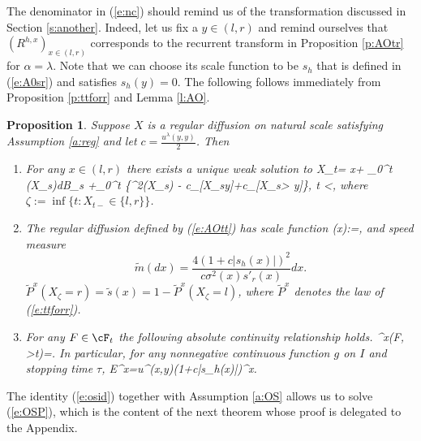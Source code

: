 \documentclass[11pt,reqno]{amsart}
\numberwithin{equation}{section}
\newtheorem{proposition}{Proposition}[section]
\begin{document}
The denominator in (\ref{e:nc}) should remind us of the transformation discussed in Section \ref{s:another}. Indeed, let us fix a $y \in (l,r)$ and remind ourselves that $(R^{h,x})_{x \in (l,r)}$ corresponds to the recurrent transform in Proposition \ref{p:AOtr} for $\alpha =\lambda$. Note that we can choose its scale function to be $s_h$ that is defined in (\ref{e:A0sr})  and satisfies $s_h(y)=0$.  The following follows immediately from Proposition \ref{p:ttforr} and Lemma \ref{l:AO}.
\begin{proposition} \label{p:AOtt} Suppose $X$ is a regular diffusion on natural scale satisfying Assumption \ref{a:reg} and let $c=\frac{u^{\lambda}(y,y)}{2}$. Then
	\begin{enumerate}
		\item For any $x \in (l,r)$ there exists a unique weak solution to 
		\be \label{e:AOtt}
		X_t= x+ \int_0^t \sigma(X_s)dB_s +\int_0^t \left\{\sigma^2(X_s) - c\chf_{[X_s\leq y]}+c\chf_{[X_s> y]}\right\}, \quad t <\zeta,
		\ee
		where $\zeta:=\inf\{t: X_{t-}\in \{l,r\}\}$.
		\item The regular diffusion defined by (\ref{e:AOtt}) has scale function
		\be \label{e:AOttscale}
		(x):=,
		\ee
		and speed measure
		\[
		\tilde{m}(dx)=\frac{4(1+c|s_h(x)|)^2}{c\sigma^2(x)s'_r(x)}dx.
		\]
		$\tilde{P}^x(X_{\zeta}=r)=\tilde{s}(x)=1-\tilde{P}^x(X_{\zeta}=l)$, where $\tilde{P}^x$ denotes the law of (\ref{e:ttforr}). 
		\item For any $F\in \cF_t$ the following absolute continuity relationship holds.
		\be \label{e:AOttAC}
		^x(F, \zeta>t)=.
		\ee
		In particular, for any nonnegative continuous function $g$ on $I$ and stopping time $\tau$,
		\be \label{e:osid}
		E^x=u^{\lambda}(x,y)\big(1+c|s_h(x)|\big)^x.
		\ee
	\end{enumerate}
\end{proposition}
The identity (\ref{e:osid}) together with Assumption \ref{a:OS} allows us to solve (\ref{e:OSP}), which is the content of the next theorem whose proof is delegated to the Appendix.
\end{document}
